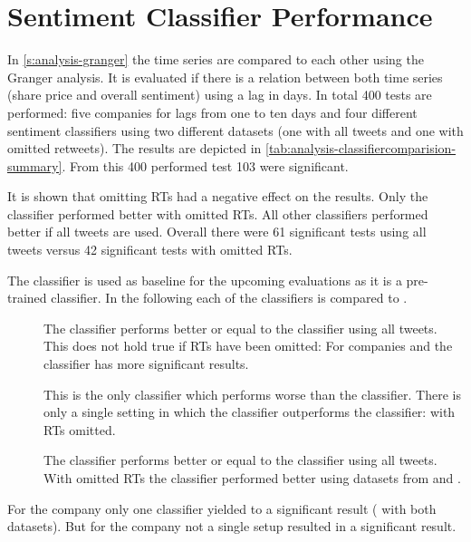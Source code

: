 \section{Sentiment Classifier Performance}
\label{s:analysis-classifercomparison}

In \cref{s:analysis-granger} the time series are compared to each other using the Granger analysis.
It is evaluated if there is a relation between both time series (share price and overall sentiment) using a lag in days.
In total 400 tests are performed: five companies for lags from one to ten days and four different sentiment classifiers using two different datasets (one with all tweets and one with omitted retweets).
The results are depicted in \cref{tab:analysis-classifiercomparision-summary}.
From this 400 performed test 103 were significant.

It is shown that omitting \acp{RT} had a negative effect on the results.
Only the \tb{} classifier performed better with omitted \acp{RT}. 
All other classifiers performed better if all tweets are used.
Overall there were 61 significant tests using all tweets versus 42 significant tests with omitted \acp{RT}.

The classifier \tb{} is used as baseline for the upcoming evaluations as it is a pre-trained classifier.
In the following each of the classifiers is compared to \tb{}.

\begin{description}
    \item[\nb{}]
        The \nb{} classifier performs better or equal to the \tb{} classifier using all tweets.
        This does not hold true if \acp{RT} have been omitted: 
        For companies \hyundai{} and \vw{} the \tb{} classifier has more significant results. 

    \item[\me{}] 
        This is the only classifier which performs worse than the \tb{} classifier.
        There is only a single setting in which the \me{} classifier outperforms the \tb{} classifier: \gm{} with \acp{RT} omitted.

    \item[\svm{}]
        The \svm{} classifier performs better or equal to the \tb{} classifier using all tweets.
        With omitted \acp{RT} the \tb{} classifier performed better using datasets from \hyundai{} and \vw{}.

\end{description}

For the company \ford{} only one classifier yielded to a significant result (\fnb{} with both datasets).
But for the company \toyota{} not a single setup resulted in a significant result.

